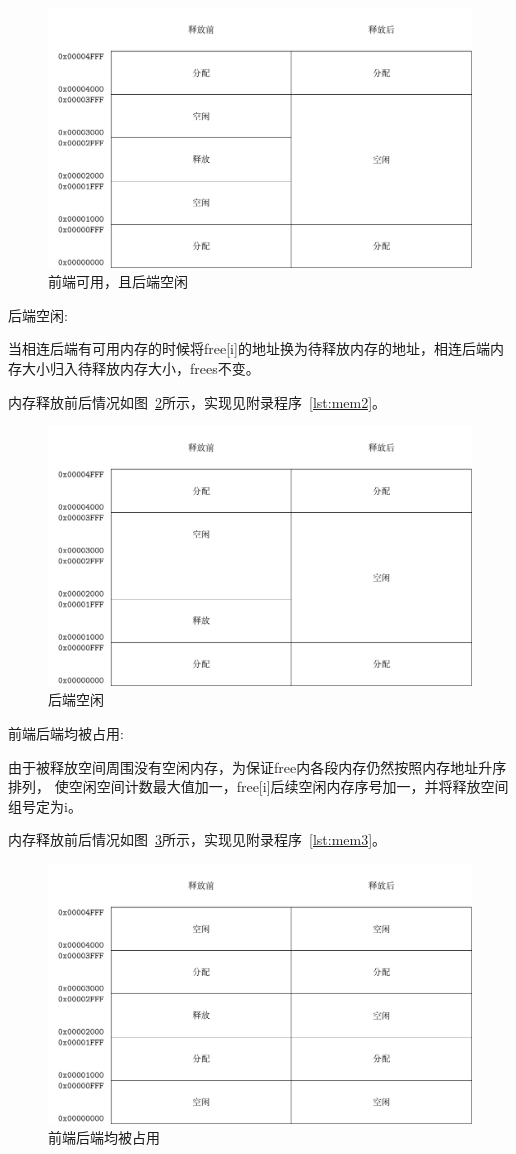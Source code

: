 \begin{figure}[h]
  \centering
  \includegraphics[width=.7\textwidth]{fig/mem1.pdf}
  \caption{前端可用，且后端空闲}
  \label{fig:mem1}
\end{figure}


\newpage
后端空闲:

当相连后端有可用内存的时候将free[i]的地址换为待释放内存的地址，相连后端内存大小归入待释放内存大小，frees不变。

内存释放前后情况如图~\ref{fig:mem2}所示，实现见附录程序~\ref{lst:mem2}。

\begin{figure}[h]
  \centering
  \includegraphics[width=.7\textwidth]{fig/mem2.pdf}
  \caption{后端空闲}
  \label{fig:mem2}
\end{figure}


前端后端均被占用:

由于被释放空间周围没有空闲内存，为保证free内各段内存仍然按照内存地址升序排列，
使空闲空间计数最大值加一，free[i]后续空闲内存序号加一，并将释放空间组号定为i。

内存释放前后情况如图~\ref{fig:mem3}所示，实现见附录程序~\ref{lst:mem3}。
\begin{figure}[h]
  \centering
  \includegraphics[width=.7\textwidth]{fig/mem3.pdf}
  \caption{前端后端均被占用}
  \label{fig:mem3}
\end{figure}